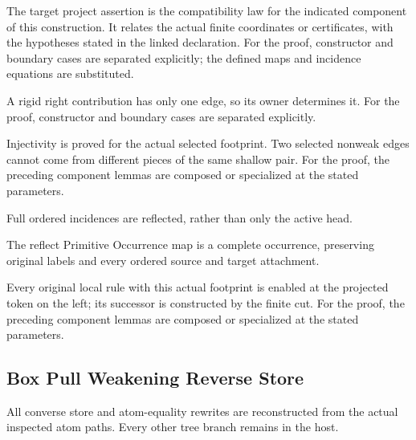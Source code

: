 The target project assertion is the compatibility law for the indicated component of this construction. It relates the actual finite coordinates or certificates, with the hypotheses stated in the linked declaration.
For the proof, constructor and boundary cases are separated explicitly; the defined maps and incidence equations are substituted.
\par{}

A rigid right contribution has only one edge, so its owner determines it.
For the proof, constructor and boundary cases are separated explicitly.
\par{}

Injectivity is proved for the actual selected footprint. Two selected nonweak edges cannot come from different pieces of the same shallow pair.
For the proof, the preceding component lemmas are composed or specialized at the stated parameters.
\par{}

Full ordered incidences are reflected, rather than only the active head.
\par{}

The reflect Primitive Occurrence map is a complete occurrence, preserving original labels and every ordered source and target attachment.
\par{}

Every original local rule with this actual footprint is enabled at the projected token on the left; its successor is constructed by the finite cut.
For the proof, the preceding component lemmas are composed or specialized at the stated parameters.
\par{}

\subsection{Box Pull Weakening Reverse Store}
All converse store and atom-equality rewrites are reconstructed from the actual inspected atom paths. Every other tree branch remains in the host.

